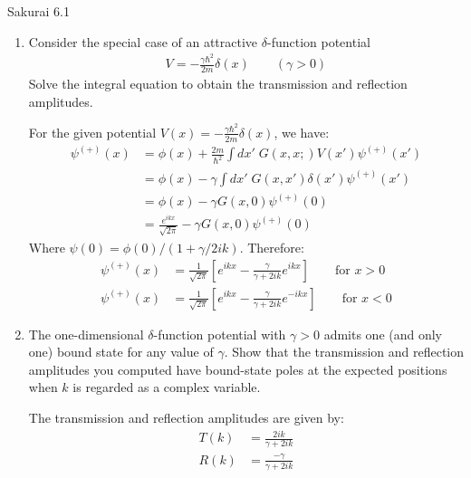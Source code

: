 \documentclass{article}
\begin{document}
\begin{section}{Sakurai 6.1}
\begin{enumerate}
	\item Consider the special case of an attractive $\delta$-function potential
	\begin{align*}
		V = - \frac{\gamma \hbar^2}{2m} \delta(x) \qquad (\gamma > 0)
	\end{align*}
	Solve the integral equation to obtain the transmission and reflection amplitudes.

	\begin{tcolorbox}
		For the given potential $V(x) = - \frac{\gamma \hbar^2}{2m} \delta(x)$, we have:
		\begin{align*}
			\psi^{(+)}(x) & = \phi(x) + \frac{2m}{\hbar^2} \int dx'\; G(x, x;) V(x') \psi^{(+)}(x') \\
			 & = \phi(x) - \gamma \int dx'\; G(x, x') \delta(x')  \psi^{(+)}(x') \\
			 & = \phi(x) - \gamma G(x, 0)  \psi^{(+)}(0) \\
			 & = \frac{e^{ikx}}{\sqrt{2\pi}} - \gamma G(x, 0)  \psi^{(+)}(0)
		\end{align*}
		Where $\psi(0) = \phi(0)/(1+\gamma/2ik)$. Therefore:
		\begin{align*}
			\psi^{(+)}(x) &= \frac{1}{\sqrt{2\pi}} \left[ e^{ikx} - \frac{\gamma}{\gamma +2ik} e^{ikx} \right] \qquad {\text{for $x > 0$}} \\
			\psi^{(+)}(x) &= \frac{1}{\sqrt{2\pi}} \left[ e^{ikx} - \frac{\gamma}{\gamma+2ik} e^{-ikx} \right] \qquad {\text{for $x < 0$}}
		\end{align*}
	\end{tcolorbox}

	\item The one-dimensional $\delta$-function potential with $\gamma > 0$ admits one (and only one) bound state for any value of $\gamma$. Show that the transmission and reflection amplitudes you computed have bound-state poles at the expected positions when $k$ is regarded as a complex variable.
	\begin{tcolorbox}
		The transmission and reflection amplitudes are given by:
		\begin{align*}
			T(k) & = \frac{2ik}{\gamma+2ik} \\
			R(k) & = \frac{-\gamma}{\gamma+2ik} 
		\end{align*}
	\end{tcolorbox}
\end{enumerate}
\end{section}
\end{document}
